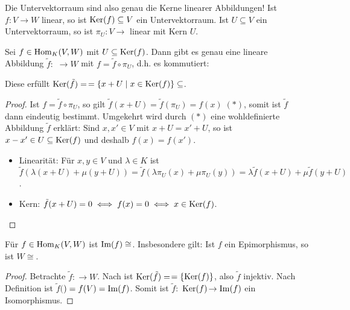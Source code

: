 \begin{remark}
	Die Untervektorraum sind also genau die Kerne linearer Abbildungen! Ist $f:V\to W$ linear, so ist $\operatorname{Ker}(f)\subseteq V$ ein Untervektorraum. 
	Ist $U\subseteq V$ ein Untervektorraum, so ist $\pi_U:V\to$ linear mit Kern $U$.
\end{remark}

\begin{theorem}[Homomorphiesatz]
	Sei $f\in \operatorname{Hom}_K(V,W)$ mit $U\subseteq \operatorname{Ker}(f)$. Dann gibt es genau eine lineare Abbildung $\tilde f:$
	$\to W$ mit $f=\tilde f \circ \pi_U$, d.h. es kommutiert: \\
	\begin{center}
	\end{center}
	Diese erfüllt $\operatorname{Ker}(\tilde f)=$$=\{x+U\mid x\in \operatorname{Ker}(f)\}\subseteq$.
\end{theorem}
\begin{proof}
	Ist $f=\tilde f\circ \pi_U$, so gilt $\tilde f(x+U)=\tilde f(\pi_U)=f(x)\; (*)$, somit ist $\tilde f$ dann eindeutig bestimmt. Umgekehrt 
	wird durch $(*)$ eine wohldefinierte Abbildung $\tilde f$ erklärt: Sind $x,x'\in V$ mit $x+U=x'+U$, so ist $x-x'\in U\subseteq \operatorname{Ker}(f)$ und 
	deshalb $f(x)=f(x')$. \\
	\begin{itemize}
		\item Linearität: Für $x,y\in V$ und $\lambda\in K$ ist $\tilde f(\lambda(x+U)+\mu(y+U))=\tilde f(\lambda\pi_U(x)+\mu\pi_U(y))=\lambda\tilde f
		(x+U)+\mu\tilde f(y+U)$.
		\item Kern: $\tilde f(x+U)=0\iff f(x)=0 \iff x\in \operatorname{Ker}(f)$.
	\end{itemize}
\end{proof}

\begin{conclusion}
	Für $f\in \operatorname{Hom}_K(V,W)$ ist $\operatorname{Im}(f)\cong $. Insbesondere gilt: Ist $f$ ein Epimorphismus, so 
	ist $W\cong $.
\end{conclusion}
\begin{proof}
	Betrachte $\tilde f:$$\to W$. Nach  ist $\operatorname{Ker}(\tilde f)=$$=\{\operatorname{Ker}(f)\}$, 
	also $\tilde f$ injektiv. Nach Definition ist $\tilde f($$)=f(V)=\operatorname{Im}(f)$. Somit ist $\tilde f:$
	{$\operatorname{Ker}(f)$}$\to \operatorname{Im}(f)$ ein Isomorphismus.
\end{proof}

